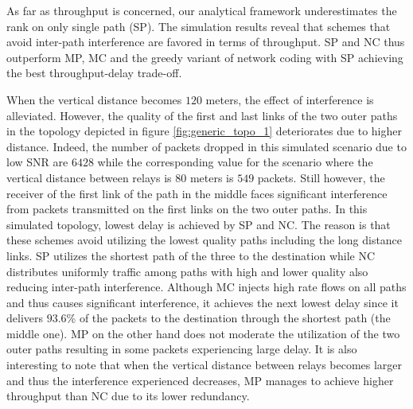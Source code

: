 \documentclass[journal, onecolumn, 12pt]{IEEEtran}
\begin{document}
As far as throughput is concerned, our analytical framework underestimates the rank on only single path (SP).
The simulation results reveal that schemes that avoid inter-path interference are favored in terms of throughput. SP and NC thus outperform MP, MC and the greedy variant of network coding
with SP achieving the best throughput-delay trade-off.

When the vertical distance becomes $120$ meters, the effect of interference is alleviated.
However, the quality of the first and last links of the two outer paths in the topology depicted in figure \ref{fig:generic_topo_1} deteriorates due to higher distance.
Indeed, the number of packets dropped in this simulated scenario due to low SNR are $6428$ while the corresponding value for the scenario where the vertical distance between relays is $80$ meters is $549$ packets.
Still however, the receiver of the first link of the path in the middle faces significant interference from packets transmitted on the first links on the two outer paths.
In this simulated topology, lowest delay is achieved by SP and NC.
The reason is that these schemes avoid utilizing the lowest quality paths including the long distance links.
SP utilizes the shortest path of the three to the destination while NC distributes uniformly traffic among paths with high and lower quality also reducing inter-path interference.
Although MC injects high rate flows on all paths and thus causes significant interference, it achieves the next lowest delay since it delivers $93.6$\% of the packets to the destination
through the shortest path (the middle one).
MP on the other hand does not moderate the utilization of the two outer paths resulting in some packets experiencing large delay.
It is also interesting to note that when the vertical distance between relays becomes larger and thus the interference experienced decreases, MP manages to achieve higher
throughput than NC due to its lower redundancy.
\end{document}
